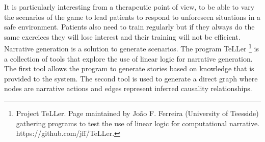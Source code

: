 \documentclass[11pt]{article}
\begin{document}
It is particularly interesting from a therapeutic point of view, to be able to vary the scenarios of the game to lead patients to respond to unforeseen situations in a safe environment. Patients also need to train regularly but if they always do the same exercices they will lose interest and their training will not be efficient. Narrative generation is a solution to generate scenarios. The program TeLLer \footnote{Project TeLLer. Page maintained by Jo\~{a}o F. Ferreira (University of Teesside) gathering programs to test the use of linear logic for computational narrative. https://github.com/jff/TeLLer.} is a collection of tools that explore the use of linear logic for narrative generation. The first tool allows the program to generate stories based on knowledge that is provided to the system. The second tool is used to generate a direct graph where nodes are narrative actions and edges represent inferred causality relationships. \\
\end{document}
